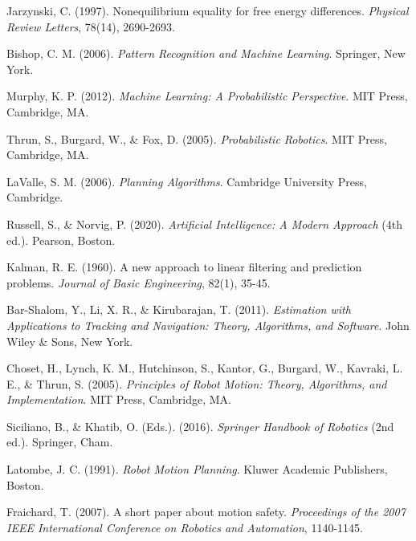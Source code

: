 \documentclass[12pt,a4paper]{article}
\begin{document}
\begin{thebibliography}{99}
 Jarzynski, C. (1997). Nonequilibrium equality for free energy differences. \textit{Physical Review Letters}, 78(14), 2690-2693.

 Bishop, C. M. (2006). \textit{Pattern Recognition and Machine Learning}. Springer, New York.

 Murphy, K. P. (2012). \textit{Machine Learning: A Probabilistic Perspective}. MIT Press, Cambridge, MA.

 Thrun, S., Burgard, W., \& Fox, D. (2005). \textit{Probabilistic Robotics}. MIT Press, Cambridge, MA.

 LaValle, S. M. (2006). \textit{Planning Algorithms}. Cambridge University Press, Cambridge.

 Russell, S., \& Norvig, P. (2020). \textit{Artificial Intelligence: A Modern Approach} (4th ed.). Pearson, Boston.

 Kalman, R. E. (1960). A new approach to linear filtering and prediction problems. \textit{Journal of Basic Engineering}, 82(1), 35-45.

 Bar-Shalom, Y., Li, X. R., \& Kirubarajan, T. (2011). \textit{Estimation with Applications to Tracking and Navigation: Theory, Algorithms, and Software}. John Wiley \& Sons, New York.

 Choset, H., Lynch, K. M., Hutchinson, S., Kantor, G., Burgard, W., Kavraki, L. E., \& Thrun, S. (2005). \textit{Principles of Robot Motion: Theory, Algorithms, and Implementation}. MIT Press, Cambridge, MA.

 Siciliano, B., \& Khatib, O. (Eds.). (2016). \textit{Springer Handbook of Robotics} (2nd ed.). Springer, Cham.

 Latombe, J. C. (1991). \textit{Robot Motion Planning}. Kluwer Academic Publishers, Boston.

 Fraichard, T. (2007). A short paper about motion safety. \textit{Proceedings of the 2007 IEEE International Conference on Robotics and Automation}, 1140-1145.

\end{thebibliography}
\end{document}

